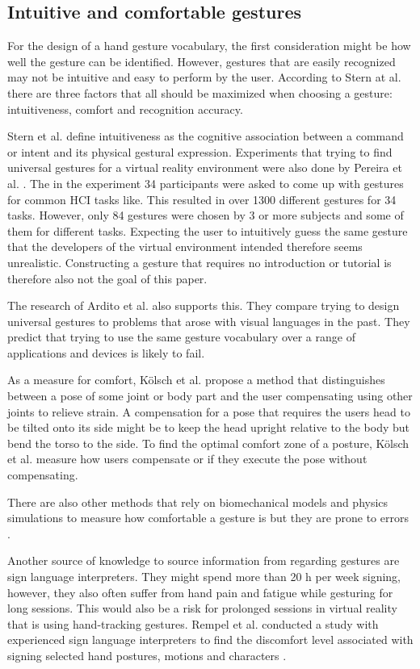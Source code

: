 \subsection{Intuitive and comfortable gestures}\label{ergonomics}
For the design of a hand gesture vocabulary, the first consideration might be how well the gesture can be identified. However, gestures that are easily recognized may not be intuitive and easy to perform by the user. According to Stern at al. \cite{Stern2006} there are three factors that all should be maximized when choosing a gesture: intuitiveness, comfort and recognition accuracy.

Stern et al. define intuitiveness as the cognitive association between a command or intent and its physical gestural expression. Experiments that trying to find universal gestures for a virtual reality environment were also done by Pereira et al. \cite{Pereira2015}. The in the experiment 34 participants were asked to come up with gestures for common HCI tasks like. %
This resulted in over 1300 different gestures for 34 tasks. However, only 84 gestures were chosen by 3 or more subjects and some of them for different tasks. Expecting the user to intuitively guess the same gesture that the developers of the virtual environment intended therefore seems unrealistic. Constructing a gesture that requires no introduction or tutorial is therefore also not the goal of this paper.

The research of Ardito et al. \cite{Ardito2014} also supports this. They compare trying to design universal gestures to problems that arose with visual languages in the past. They predict that trying to use the same gesture vocabulary over a range of applications and devices is likely to fail. 


As a measure for comfort, Kölsch et al. propose a method that distinguishes between a pose of some joint or body part and the user compensating using other joints to relieve strain. A compensation for a pose that requires the users head to be tilted onto its side might be to keep the head upright relative to the body but bend the torso to the side. To find the optimal comfort zone of a posture, Kölsch et al. \cite{Koelsch} measure how users compensate or if they execute the pose without compensating. 

There are also other methods that rely on biomechanical models and physics simulations to measure how comfortable a gesture is but they are prone to errors \cite{Stern2006}.

Another source of knowledge to source information from regarding gestures are sign language interpreters. They might spend more than 20 h per week signing, however, they also often suffer from hand pain and fatigue while gesturing for long sessions. This would also be a risk for prolonged sessions in virtual reality that is using hand-tracking gestures. Rempel et al. conducted a study with experienced sign language interpreters to find the discomfort level associated with signing selected hand postures, motions and characters \cite{Rempel2014}. 

